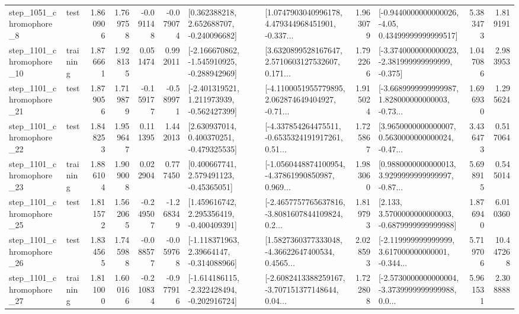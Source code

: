 \begin{tabular}{llrrrrllrlrr}
  step\_1051\_chromophore\_8 &      test &      1.860906 &    1.769758 &     -0.091148 & -0.079074 &    [0.362388218, 2.652688707, -0.240096682] &  [1.0747903040996178, 4.479344968451901, -0.337... &       1.963079 &  [-0.9440000000000026, -4.05, 0.43499999999999517] &            5.383473 &          1.819191 \\
 step\_1101\_chromophore\_10 &  training &      1.876661 &    1.928135 &      0.051474 &  0.992011 &  [-2.166670862, -1.545910925, -0.288942969] &  [3.6320899528167647, 2.5710603127532607, 0.171... &       1.792266 &  [-3.3740000000000023, -2.381999999999999, -0.375] &            1.047086 &          2.983953 \\
 step\_1101\_chromophore\_21 &      test &      1.879056 &    1.719879 &     -0.159177 & -0.589971 &   [-2.401319521, 1.211973939, -0.562427399] &  [-4.1100051955779895, 2.062874649404927, -0.71... &       1.915024 &  [-3.6689999999999987, 1.828000000000003, -0.73... &            1.696930 &          1.295624 \\
 step\_1101\_chromophore\_22 &      test &      1.848253 &    1.959647 &      0.111395 &  1.442013 &    [2.630937014, 0.400370251, -0.479325535] &  [-4.337854264475511, -0.6535324191917261, 0.51... &       1.725867 &  [3.9650000000000007, 0.5630000000000024, -0.47... &            3.436473 &          0.517064 \\
 step\_1101\_chromophore\_23 &  training &      1.886104 &    1.909008 &      0.022904 &  0.777450 &     [0.400667741, 2.579491123, -0.45365051] &  [-1.0560448874100954, -4.37861990850987, 0.969... &       1.983060 &  [0.9880000000000013, 3.9299999999999997, -0.87... &            5.698915 &          0.545014 \\
 step\_1101\_chromophore\_25 &      test &      1.811572 &    1.562065 &     -0.249507 & -1.268349 &    [1.459616742, 2.295356419, -0.400409391] &  [-2.4657757765637816, -3.8081607844109824, 0.2... &       1.819793 &   [2.133, 3.5700000000000003, -0.6879999999999988] &            1.876940 &          6.010360 \\
 step\_1101\_chromophore\_26 &      test &      1.834565 &    1.745988 &     -0.088577 & -0.059768 &    [-1.118371963, 2.39664147, -0.314088966] &  [1.5827360377333048, -4.36622647400534, 0.4565... &       2.028593 &  [-2.119999999999999, 3.617000000000001, -0.344... &            5.719706 &         10.447268 \\
 step\_1101\_chromophore\_27 &  training &      1.811000 &    1.600166 &     -0.210834 & -0.977916 &  [-1.614186115, -2.322428494, -0.202916724] &  [-2.6082413388259167, -3.707151377148644, 0.04... &       1.722808 &  [-2.5730000000000004, -3.3739999999999988, 0.0... &            5.961531 &          2.308888 \\

\end{tabular}
